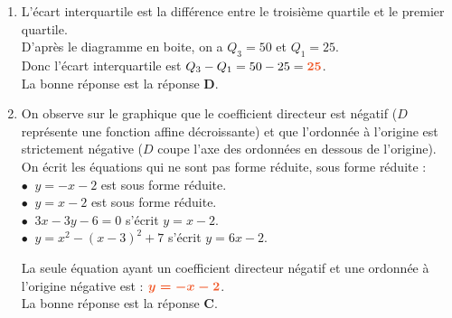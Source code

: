 \documentclass[a4paper,11pt]{article}
\begin{document}
{\begin{seanceD}{}
\begin{enumerate}
\item L'écart interquartile est la différence entre le troisième quartile et le premier quartile.\\
      D'après le diagramme en boite, on a $Q_3 = 50$ et $Q_1 = 25$.\\
      Donc l'écart interquartile est $Q_3 - Q_1 = 50 - 25 = {\color[HTML]{F15929}\boldsymbol{25}}$.\\La bonne réponse est la réponse {\bfseries \color[HTML]{F15929}D}.

\item On observe sur le graphique que le coefficient directeur est négatif ($D$ représente une fonction affine décroissante) et que l'ordonnée à l'origine est strictement négative ($D$ coupe l'axe des ordonnées en dessous de l'origine).\\On écrit les équations qui ne sont pas forme réduite, sous forme réduite :\\$\bullet\:$ $y=-x-2$ est  sous forme réduite.\\$\bullet\:$ $y=x-2$ est  sous forme réduite.\\$\bullet\:$ $3x-3y-6=0$ s'écrit $y=x-2$.\\$\bullet\:$ $y=x^2-(x-3)^2+7$ s'écrit $y=6x-2$.

\medskip
La seule équation ayant un coefficient directeur négatif et une ordonnée à l'origine négative est : ${\color[HTML]{F15929}\boldsymbol{y=-x-2}}$.\\La bonne réponse est la réponse {\bfseries \color[HTML]{F15929}C}.

\end{enumerate}

\end{seanceD}
}{}
\end{document}
